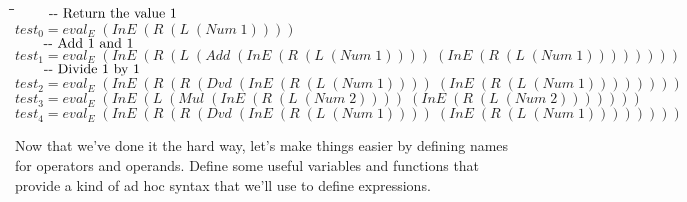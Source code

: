\documentclass[10pt]{article}
\newlength{\lwidth}\setlength{\lwidth}{4.5cm}
\newlength{\cwidth}\setlength{\cwidth}{8mm} %
\newcommand{\Conid}[1]{\mathit{#1}}
\newcommand{\Varid}[1]{\mathit{#1}}
\begin{document}
\begin{tabbing}
\qquad\=\hspace{\lwidth}\=\hspace{\cwidth}\=\+\kill
${\mbox{\qquad-{}-  Return the value 1}}$\\
${\Varid{test}_0\mathrel{=}\Varid{eval}_E\;(\Conid{InE}\;(\Conid{R}\;(\Conid{L}\;(\Conid{Num}\;\mathrm{1}))))}$\\
${}$\\
${\mbox{\qquad-{}-  Add 1 and 1}}$\\
${\Varid{test}_1\mathrel{=}\Varid{eval}_E\;(\Conid{InE}\;(\Conid{R}\;(\Conid{L}\;(\Conid{Add}\;(\Conid{InE}\;(\Conid{R}\;(\Conid{L}\;(\Conid{Num}\;\mathrm{1}))))\;(\Conid{InE}\;(\Conid{R}\;(\Conid{L}\;(\Conid{Num}\;\mathrm{1}))))))))}$\\
${}$\\
${\mbox{\qquad-{}-  Divide 1 by 1}}$\\
${\Varid{test}_2\mathrel{=}\Varid{eval}_E\;(\Conid{InE}\;(\Conid{R}\;(\Conid{R}\;(\Conid{Dvd}\;(\Conid{InE}\;(\Conid{R}\;(\Conid{L}\;(\Conid{Num}\;\mathrm{1}))))\;(\Conid{InE}\;(\Conid{R}\;(\Conid{L}\;(\Conid{Num}\;\mathrm{1}))))))))}$\\
${}$\\
${\Varid{test}_3\mathrel{=}\Varid{eval}_E\;(\Conid{InE}\;(\Conid{L}\;(\Conid{Mul}\;(\Conid{InE}\;(\Conid{R}\;(\Conid{L}\;(\Conid{Num}\;\mathrm{2}))))\;(\Conid{InE}\;(\Conid{R}\;(\Conid{L}\;(\Conid{Num}\;\mathrm{2})))))))}$\\
${}$\\
${\Varid{test}_4\mathrel{=}\Varid{eval}_E\;(\Conid{InE}\;(\Conid{R}\;(\Conid{R}\;(\Conid{Dvd}\;(\Conid{InE}\;(\Conid{R}\;(\Conid{L}\;(\Conid{Num}\;\mathrm{1}))))\;(\Conid{InE}\;(\Conid{R}\;(\Conid{L}\;(\Conid{Num}\;\mathrm{1}))))))))}$
\end{tabbing}
Now that we've done it the hard way, let's make things easier by
defining names for operators and operands.  Define some useful
variables and functions that provide a kind of ad hoc syntax that we'll use
to define expressions.
\end{document}
